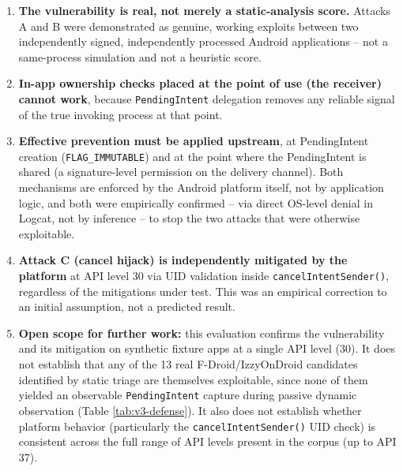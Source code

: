 \documentclass[11pt]{article}
\begin{document}
\begin{enumerate}[leftmargin=1.5em]
    \item \textbf{The vulnerability is real, not merely a static-analysis score.} Attacks
    A and B were demonstrated as genuine, working exploits between two independently
    signed, independently processed Android applications -- not a same-process
    simulation and not a heuristic score.
    \item \textbf{In-app ownership checks placed at the point of use (the receiver)
    cannot work}, because \texttt{PendingIntent} delegation removes any reliable signal
    of the true invoking process at that point.
    \item \textbf{Effective prevention must be applied upstream}, at PendingIntent
    creation (\texttt{FLAG\_IMMUTABLE}) and at the point where the PendingIntent is
    shared (a signature-level permission on the delivery channel). Both mechanisms are
    enforced by the Android platform itself, not by application logic, and both were
    empirically confirmed -- via direct OS-level denial in Logcat, not by inference --
    to stop the two attacks that were otherwise exploitable.
    \item \textbf{Attack C (cancel hijack) is independently mitigated by the platform}
    at API level 30 via UID validation inside \texttt{cancelIntentSender()}, regardless
    of the mitigations under test. This was an empirical correction to an initial
    assumption, not a predicted result.
    \item \textbf{Open scope for further work:} this evaluation confirms the
    vulnerability and its mitigation on synthetic fixture apps at a single API level
    (30). It does not establish that any of the 13 real F-Droid/IzzyOnDroid candidates
    identified by static triage are themselves exploitable, since none of them yielded
    an observable \texttt{PendingIntent} capture during passive dynamic observation
    (Table \ref{tab:v3-defense}). It also does not establish whether platform behavior
    (particularly the \texttt{cancelIntentSender()} UID check) is consistent across the
    full range of API levels present in the corpus (up to API 37).
\end{enumerate}
\end{document}
